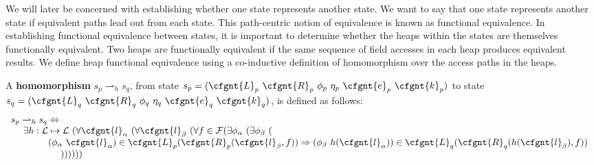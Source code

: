 We will later be concerned with establishing whether one state
represents another state. We want to say that one state represents
another state if equivalent paths lead out from each state. This
path-centric notion of equivalence is known as functional
equivalence. In establishing functional equivalence between states, it
is important to determine whether the heaps within the states are
themselves functionally equivalent. Two heaps are functionally
equivalent if the same sequence of field accesses in each heap
produces equivalent results. We define heap functional equivalence
using a co-inductive definition of homomorphism over the access paths
in the heaps.

\begin{definition}
\label{def:homomorphism}
A \textbf{homomorphism} $s_p \rightharpoonup_{h} s_q$, from state $s_p = ( \cfgnt{L}_p\ \cfgnt{R}_p\ \phi_p\ \eta_p\ \cfgnt{e}_p\ \cfgnt{k}_p )$ to state $s_q = ( \cfgnt{L}_q\ \cfgnt{R}_q\ \phi_q\ \eta_q\ \cfgnt{e}_q\ \cfgnt{k}_q )$, is defined as follows: 
$$
\begin{array}{l}
 s_p \rightharpoonup_{h} s_q \Leftrightarrow \\
\ \ \ \ \exists h: \mathcal{L} \mapsto \mathcal{L}\ (\forall \cfgnt{l}_\alpha\ (\forall \cfgnt{l}_\beta\ (\forall f \in \mathcal{F}( \exists \phi_\alpha\ (\exists \phi_\beta\ ( \\ 
\ \ \ \ \ \ \ \ \ \ \ \ (\phi_\alpha\ \cfgnt{l}_\alpha) \in \cfgnt{L}_p(\cfgnt{R}_p (\cfgnt{l}_\beta,f )) \Rightarrow (\phi_\beta\ h(\cfgnt{l}_\alpha))\in \cfgnt{L}_q(\cfgnt{R}_q (h(\cfgnt{l}_\beta),f ))\ \\
\ \ \ \ \ \ \ \ \ \ \ \ \ \ \ \  )) ) ) ) )
\end{array}
$$
\begin{comment}
$$
\begin{array}{l}
s_p \rightharpoonup_{h} s_q \Leftrightarrow \\
\ \ \ \ \exists h: \mathcal{L} \mapsto \mathcal{L}\ (\forall \cfgnt{l}_\beta\ (\forall f \in \mathit{fields}(\mathrm{type}(\cfgnt{l}_\beta))\ ( \\
\ \ \ \ \ \ \ \ \ \ \ \ \forall (\phi_\alpha\ \cfgnt{l}_\alpha) \in \cfgnt{L}_p(\cfgnt{R}_p (\cfgnt{l}_\beta,f ))\ ( \\
\ \ \ \ \ \ \ \ \ \ \ \ \ \ \ \ \exists \phi_\beta\ ((\phi_\beta\ h(\cfgnt{l}_\alpha))\in \cfgnt{L}_q(\cfgnt{R}_q (h(\cfgnt{l}_\beta),f )))))))\\
\end{array}
$$
\end{comment}
\end{definition}

